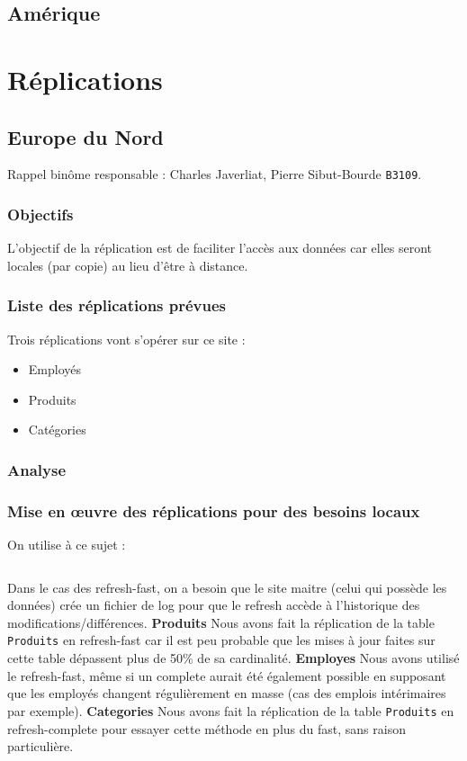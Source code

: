 \documentclass[10pt,a4paper]{article}
\theoremstyle{plain}
\begin{document}
\newpage

\subsection{Amérique}
\newpage

\section{Réplications}
\subsection{Europe du Nord}
Rappel binôme responsable : Charles Javerliat, Pierre Sibut-Bourde \verb|B3109|.
\subsubsection{Objectifs}
L’objectif de la réplication est de faciliter l’accès aux données car elles seront locales (par copie) au lieu d'être à distance.

\subsubsection{Liste des réplications prévues}
Trois réplications vont s'opérer sur ce site :
\begin{itemize}
    \item Employés
    \item Produits
    \item Catégories
\end{itemize}

\subsubsection{Analyse}

\subsubsection{Mise en \oe uvre des réplications pour des besoins locaux}
On utilise à ce sujet :
\inputminted{sql}{INSA-DB12-EuropeNord-replication.sql}
Dans le cas des refresh-fast, on a besoin que le site maitre (celui qui possède les données) crée un fichier de log pour que le refresh accède à l'historique des modifications/différences.
\hfill\break\hfill\break
\textbf{Produits}
Nous avons fait la réplication de la table \verb|Produits| en refresh-fast car il est peu probable que les mises à jour faites sur cette table dépassent plus de 50\% de sa cardinalité.
\hfill\break\hfill\break
\textbf{Employes}
Nous avons utilisé le refresh-fast, même si un complete aurait été également possible en supposant que les employés changent régulièrement en masse (cas des emplois intérimaires par exemple).
\hfill\break\hfill\break
\textbf{Categories}
Nous avons fait la réplication de la table \verb|Produits| en refresh-complete pour essayer cette méthode en plus du fast, sans raison particulière.
\hfill\break\hfill\break
\end{document}
